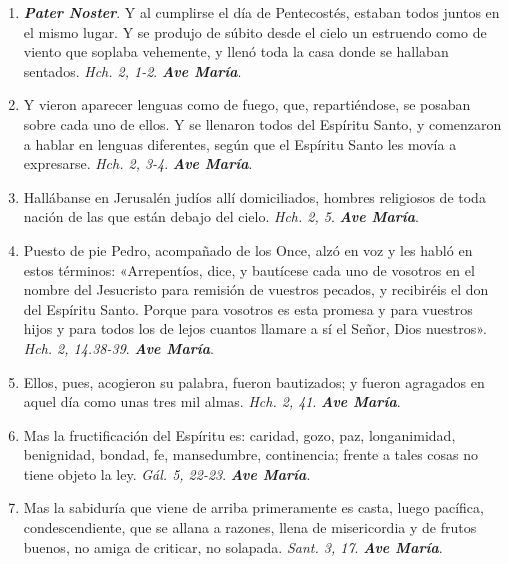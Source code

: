 \documentclass[../../devocionario.tex]{subfiles}
\begin{document}
    \begin{enumerate}
    
        \item \textbf{\emph{Pater Noster}}. Y al cumplirse el día de Pentecostés, estaban todos juntos en el mismo lugar. Y se produjo de súbito desde el cielo un estruendo como de viento 
            que soplaba vehemente, y llenó toda la casa donde se hallaban sentados. \emph{Hch. 2, 1-2}. \textbf{\emph{Ave María}}.

        \item Y vieron aparecer lenguas como de fuego, que, repartiéndose, se posaban sobre cada uno de ellos. Y se llenaron todos del Espíritu Santo, y comenzaron a hablar en lenguas diferentes, 
            según que el Espíritu Santo les movía a expresarse. \emph{Hch. 2, 3-4}. \textbf{\emph{Ave María}}.

        \item Hallábanse en Jerusalén judíos allí domiciliados, hombres religiosos de toda nación de las que están debajo del cielo. \emph{Hch. 2, 5}. \textbf{\emph{Ave María}}.

        \item Puesto de pie Pedro, acompañado de los Once, alzó en voz y les habló en estos términos: «Arrepentíos, dice, y bautícese cada uno de vosotros en el nombre del 
            Jesucristo para remisión de vuestros pecados, y recibiréis el don del Espíritu Santo. Porque para vosotros es esta promesa y para vuestros hijos y para todos los de lejos
            cuantos llamare a sí el Señor, Dios nuestros». \emph{Hch. 2, 14.38-39}. \textbf{\emph{Ave María}}.

        \item Ellos, pues, acogieron su palabra, fueron bautizados; y fueron agragados en aquel día como unas tres mil almas. \emph{Hch. 2, 41}. \textbf{\emph{Ave María}}.

        \item Mas la fructificación del Espíritu es: caridad, gozo, paz, longanimidad, benignidad, bondad, fe, mansedumbre, continencia; frente a tales cosas no tiene objeto la ley. 
            \emph{Gál. 5, 22-23}. \textbf{\emph{Ave María}}.

        \item Mas la sabiduría que viene de arriba primeramente es casta, luego pacífica, condescendiente, que se allana a razones, llena de misericordia y de frutos buenos, 
            no amiga de criticar, no solapada. \emph{Sant. 3, 17}. \textbf{\emph{Ave María}}.


\end{enumerate}
\end{document}
